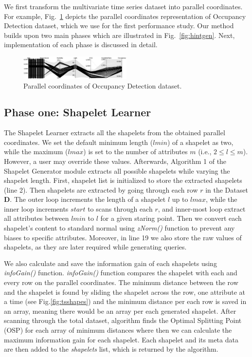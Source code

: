 \documentclass[conference]{IEEEtran}  %
\begin{document}
We first transform the multivariate time series dataset into parallel coordinates. For example, Fig.~\ref{fig:ODdata} depicts the parallel coordinates representation of Occupancy Detection dataset, which we use for the first performance study. Our method builds upon two main phases which are illustrated in Fig.~\ref{fig:hintgen}. Next, implementation of each phase is discussed in detail.

\begin{figure}
\includegraphics[width=0.5\textwidth]{occupancy_d3.png}
\caption{Parallel coordinates of Occupancy Detection dataset.}
\label{fig:ODdata}
\end{figure}

\subsection{Phase one: Shapelet Learner}
The Shapelet Learner extracts all the shapelets from the obtained parallel coordinates. We set the default minimum length ($l{min}$) of a shapelet as two, while the maximum ($l{max}$) is set to the number of attributes $m$ (i.e., $2 \leq l \leq m$). However, a user may override these values. Afterwards, Algorithm 1 of the Shapelet Generator module extracts all possible shapelets while varying the shapelet length. First, shapelet list is initialized to store the extracted shapelets (line 2). Then shapelets are extracted by going through each row $r$ in the Dataset \textbf{D}. The outer loop increments the length of a shapelet $l$ up to $l{max}$, while the inner loop increments $start$ to scans through each $r$, and inner-most loop extract all attributes between $l{min}$ to $l$ for a given staring point. Then we convert each shapelet’s content to standard normal using \textit{zNorm()} function to prevent any biases to specific attributes. Moreover, in line 19 we also store the raw values of shapelets, as they are later required while generating queries. 

We also calculate and save the information gain of each shapelets using \textit{infoGain()} function. \textit{infoGain()} function compares the shapelet with each and every row on the parallel coordinates. The minimum distance between the row and the shapelet is found by sliding the shapelet across the row, one attribute at a time (see Fig.\ref{fig:tsshapes}) and the minimum distance per each row is saved in an array, meaning there would be an array per each generated shapelet. 
After scanning through the total dataset, algorithm finds the Optimal Splitting Point (OSP) for each array of minimum distances where then we can calculate the maximum information gain for each shapelet. Each shapelet and its meta data are then added to the \textit{shapelets} list, which is returned by the algorithm.
\end{document}
